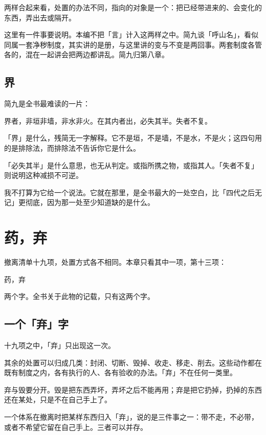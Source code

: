 两样合起来看，处置的办法不同，指向的对象是一个：把已经带进来的、会变化的东西，弄出去或隔开。

这里有一件事要说明。本编不把「言」计入这两样之中。简九谈「呼山名」，看似同属一套净秽制度，其实讲的是册，与这里讲的变与不变是两回事。两套制度各管各的，混在一起讲会把两边都讲乱。简九归第八章。

\section{界}

简九是全书最难读的一片：

\begin{center}
\small
界者，非垣非墙，非水非火。在其内者出，必失其半。失者不复。
\end{center}

「界」是什么，残简无一字解释。它不是垣，不是墙，不是水，不是火；这四句用的是排除法，而排除法不告诉你它是什么。

「必失其半」是什么意思，也无从判定。或指所携之物，或指其人。「失者不复」则说明这种减损不可逆。

我不打算为它给一个说法。它就在那里，是全书最大的一处空白，比「四代之后无记」更彻底，因为那一处至少知道缺的是什么。

\chapter{药，弃}

撤离清单十九项，处置方式各不相同。本章只看其中一项，第十三项：

\begin{center}
\small
药，弃
\end{center}

两个字。全书关于此物的记载，只有这两个字。

\section{一个「弃」字}

十九项之中，「弃」只出现这一次。

其余的处置可以归成几类：封闭、切断、毁掉、收走、移走、削去。这些动作都在既有制度之内，各有执行的人、各有验收的办法。「弃」不在任何一类里\nobreak。

弃与毁要分开。毁是把东西弄坏，弄坏之后不能再用；弃是把它扔掉，扔掉的东西还在某处，只是不在自己手上了。

一个体系在撤离时把某样东西归入「弃」，说的是三件事之一：带不走，不必带，或者不希望它留在自己手上。三者可以并存。

